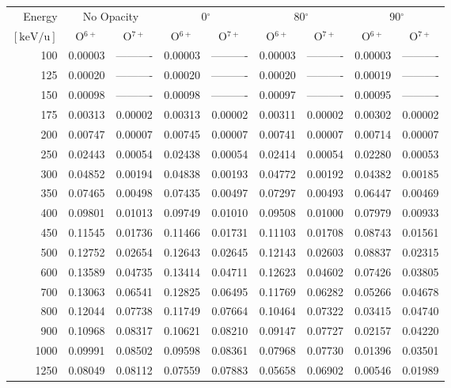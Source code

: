 \begin{table}[ht]
\begin{tabular}{r|c|c|c|c|c|c|c|c}
    Energy & \multicolumn{2}{c|}{No Opacity} & \multicolumn{2}{c|}{0$^\circ$} & \multicolumn{2}{c|}{80$^\circ$} & \multicolumn{2}{c}{90$^\circ$} \\ \cline{2-9}
    $\mathrm{[keV/u]}$ & O$^{6+}$ & O$^{7+}$ & O$^{6+}$ & O$^{7+}$ & O$^{6+}$ & O$^{7+}$ & O$^{6+}$ & O$^{7+}$ \\ \cline{1-9}
      100 & 0.00003 & ---------- & 0.00003 & ---------- & 0.00003 & ---------- & 0.00003 & ---------- \\
      125 & 0.00020 & ---------- & 0.00020 & ---------- & 0.00020 & ---------- & 0.00019 & ---------- \\
      150 & 0.00098 & ---------- & 0.00098 & ---------- & 0.00097 & ---------- & 0.00095 & ---------- \\
      175 & 0.00313 & 0.00002 & 0.00313 & 0.00002 & 0.00311 & 0.00002 & 0.00302 & 0.00002 \\
      200 & 0.00747 & 0.00007 & 0.00745 & 0.00007 & 0.00741 & 0.00007 & 0.00714 & 0.00007 \\
      250 & 0.02443 & 0.00054 & 0.02438 & 0.00054 & 0.02414 & 0.00054 & 0.02280 & 0.00053 \\
      300 & 0.04852 & 0.00194 & 0.04838 & 0.00193 & 0.04772 & 0.00192 & 0.04382 & 0.00185 \\
      350 & 0.07465 & 0.00498 & 0.07435 & 0.00497 & 0.07297 & 0.00493 & 0.06447 & 0.00469 \\
      400 & 0.09801 & 0.01013 & 0.09749 & 0.01010 & 0.09508 & 0.01000 & 0.07979 & 0.00933 \\
      450 & 0.11545 & 0.01736 & 0.11466 & 0.01731 & 0.11103 & 0.01708 & 0.08743 & 0.01561 \\
      500 & 0.12752 & 0.02654 & 0.12643 & 0.02645 & 0.12143 & 0.02603 & 0.08837 & 0.02315 \\
      600 & 0.13589 & 0.04735 & 0.13414 & 0.04711 & 0.12623 & 0.04602 & 0.07426 & 0.03805 \\
      700 & 0.13063 & 0.06541 & 0.12825 & 0.06495 & 0.11769 & 0.06282 & 0.05266 & 0.04678 \\
      800 & 0.12044 & 0.07738 & 0.11749 & 0.07664 & 0.10464 & 0.07322 & 0.03415 & 0.04740 \\
      900 & 0.10968 & 0.08317 & 0.10621 & 0.08210 & 0.09147 & 0.07727 & 0.02157 & 0.04220 \\
     1000 & 0.09991 & 0.08502 & 0.09598 & 0.08361 & 0.07968 & 0.07730 & 0.01396 & 0.03501 \\
     1250 & 0.08049 & 0.08112 & 0.07559 & 0.07883 & 0.05658 & 0.06902 & 0.00546 & 0.01989 \\

\end{tabular}
\end{table}
